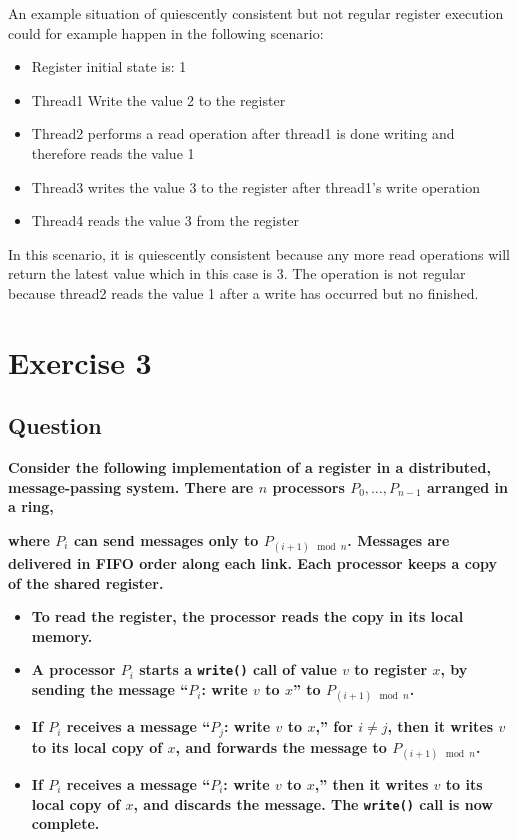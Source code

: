 \documentclass{article}
\begin{document}
An example situation of quiescently consistent but not regular register execution could for example happen in the following scenario:

\begin{itemize}
    \item Register initial state is: 1
    \item Thread1 Write the value 2 to the register
    \item Thread2 performs a read operation after thread1 is done writing and therefore reads the value 1
    \item Thread3 writes the value 3 to the register after thread1's write operation
    \item Thread4 reads the value 3 from the register
\end{itemize}

In this scenario, it is quiescently consistent because any more read operations will return the latest value which in this case is 3. The operation is not regular because thread2 reads the value 1 after a write has occurred but no finished.




\section*{Exercise 3}
\subsection*{Question}
\textbf{Consider the following implementation of a register in a distributed, message-passing system. There are $n$ processors $P_0, \ldots, P_{n-1}$ arranged in a ring,}

\textbf{where $P_i$ can send messages only to $P_{(i+1) \mod n}$. Messages are delivered in FIFO order along each link. Each processor keeps a copy of the shared register.}

\begin{itemize}
    \item \textbf{To read the register, the processor reads the copy in its local memory.}
    \item \textbf{A processor $P_i$ starts a \texttt{write()} call of value $v$ to register $x$, by sending the message ``$P_i$: write $v$ to $x$'' to $P_{(i+1) \mod n}$.}
    \item \textbf{If $P_i$ receives a message ``$P_j$: write $v$ to $x$,'' for $i \neq j$, then it writes $v$ to its local copy of $x$, and forwards the message to $P_{(i+1) \mod n}$.}
    \item \textbf{If $P_i$ receives a message ``$P_i$: write $v$ to $x$,'' then it writes $v$ to its local copy of $x$, and discards the message. The \texttt{write()} call is now complete.}
\end{itemize}
\end{document}
